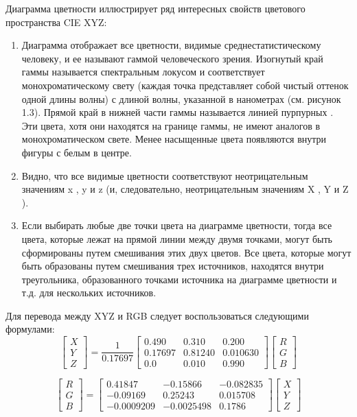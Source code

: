 Диаграмма цветности иллюстрирует ряд интересных свойств цветового пространства CIE XYZ:
\begin{enumerate}
	\item Диаграмма отображает все цветности, видимые среднестатистическому человеку, и ее называют  гаммой человеческого зрения. Изогнутый край гаммы называется спектральным локусом и соответствует монохроматическому свету (каждая точка представляет собой чистый оттенок одной длины волны) с длиной волны, указанной в нанометрах (см. рисунок 1.3). Прямой край в нижней части гаммы называется линией пурпурных . Эти цвета, хотя они находятся на границе гаммы, не имеют аналогов в монохроматическом свете. Менее насыщенные цвета появляются внутри фигуры с белым в центре. 
	\item Видно, что все видимые цветности соответствуют неотрицательным значениям x , y и z (и, следовательно, неотрицательным значениям X , Y и Z ).
	\item Если выбирать любые две точки цвета на диаграмме цветности, тогда все цвета, которые лежат на прямой линии между двумя точками, могут быть сформированы путем смешивания этих двух цветов.  Все цвета, которые могут быть образованы путем смешивания трех источников, находятся внутри треугольника, образованного точками источника на диаграмме цветности и т.д. для нескольких источников.
\end{enumerate}

Для перевода между XYZ и  RGB следует воспользоваться следующими формулами: 
\begin{equation}
\begin{bmatrix} X \\ Y \\ Z \end{bmatrix} = \frac{1}{0.17697} \begin{bmatrix}  0.490 & 0.310 & 0.200 \\ 0.17697 & 0.81240 & 0.010630 \\ 0.0 & 0.010 & 0.990 \end{bmatrix} \begin{bmatrix} R \\ G \\ B \end{bmatrix} 
\end{equation} 

\begin{equation}
\begin{bmatrix} R \\ G \\ B \end{bmatrix} =  \begin{bmatrix}  0.41847 &  -0.15866 & -0.082835 \\ -0.09169 &  0.25243 &  0.015708  \\ -0.0009209 & -0.0025498 & 0.1786\end{bmatrix} \begin{bmatrix} X\\ Y \\ Z \end{bmatrix} 
\end{equation} 

